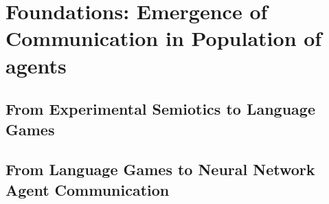 \chapter{Foundations: Emergence of Communication in Population of agents}

\minitoc


\section{From Experimental Semiotics to Language Games}

\section{From Language Games to Neural Network Agent Communication}

